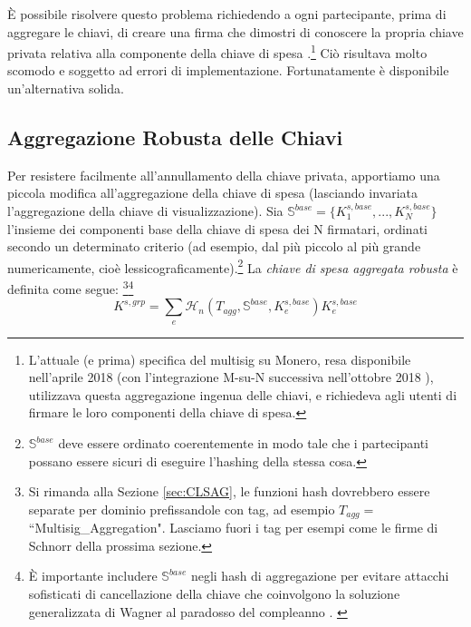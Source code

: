 È possibile risolvere questo problema richiedendo a ogni partecipante, prima di aggregare le chiavi, di creare una firma che dimostri di conoscere la propria chiave privata relativa alla componente della chiave di spesa \cite{old-multisig-mrl-note}.\footnote{L'attuale (e prima) specifica del multisig su Monero, resa disponibile nell'aprile 2018 \cite{lithiumluna-v7} (con l'integrazione M-su-N successiva nell'ottobre 2018 \cite{berylliumbullet-v8}), utilizzava questa aggregazione ingenua delle chiavi, e richiedeva agli utenti di firmare le loro componenti della chiave di spesa.} Ciò risultava molto scomodo e soggetto ad errori di implementazione. Fortunatamente è disponibile un'alternativa solida.%


\subsection{Aggregazione Robusta delle Chiavi}
\label{sec:robust-key-aggregation}

Per resistere facilmente all'annullamento della chiave privata, apportiamo una piccola modifica all'aggregazione della chiave di spesa (lasciando invariata l'aggregazione della chiave di visualizzazione). Sia $\mathbb{S}^{base} = \{K^{s,base}_1,...,K^{s,base}_N\}$ l'insieme dei componenti base della chiave di spesa dei N firmatari, ordinati secondo un determinato criterio (ad esempio, dal più piccolo al più grande numericamente, cioè lessicograficamente).\footnote{$\mathbb{S}^{base}$ deve essere ordinato coerentemente in modo tale che i partecipanti possano essere sicuri di eseguire l'hashing della stessa cosa.} La \emph{chiave di spesa aggregata robusta} è definita come segue: \cite{MRL-0009-multisig}\footnote{Si rimanda alla Sezione \ref{sec:CLSAG}, le funzioni hash dovrebbero essere separate per dominio prefissandole con tag, ad esempio $T_{agg} =$ ``Multisig\_Aggregation". Lasciamo fuori i tag per esempi come le firme di Schnorr della prossima sezione.}\footnote{È importante includere $\mathbb{S}^{base}$ negli hash di aggregazione per evitare attacchi sofisticati di cancellazione della chiave che coinvolgono la soluzione generalizzata di Wagner al paradosso del compleanno \cite{generalized-birthday-wagner}. \cite{adam-wagnerian-tragedies} \cite{maxwell2018simple-musig}}\vspace{.175cm}
\[K^{s,grp} = \sum_e \mathcal{H}_n(T_{agg},\mathbb{S}^{base},K^{s,base}_e)K^{s,base}_e\]

